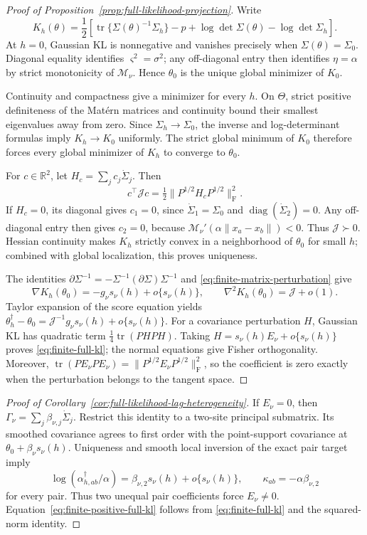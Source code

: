 \documentclass[11pt]{article}
\theoremstyle{remark}
\newcommand{\Matern}{\mathcal M}
\newcommand{\R}{\mathbb R}
\newcommand{\tr}{\operatorname{tr}}
\begin{document}
\begin{proof}[Proof of Proposition~\ref{prop:full-likelihood-projection}]
Write
\[
 K_h(\theta)=\frac12\left[
 \tr\{\Sigma(\theta)^{-1}\Sigma_h\}-p+
 \log\det\Sigma(\theta)-\log\det\Sigma_h\right].
\]
At \(h=0\), Gaussian KL is nonnegative and vanishes precisely when
\(\Sigma(\theta)=\Sigma_0\). Diagonal equality identifies
\(\varsigma^2=\sigma^2\); any off-diagonal entry then identifies
\(\eta=\alpha\) by strict monotonicity of \(\Matern_\nu\). Hence
\(\theta_0\) is the unique global minimizer of \(K_0\).

Continuity and compactness give a minimizer for every \(h\). On \(\Theta\),
strict positive definiteness of the Matérn matrices and continuity bound their
smallest eigenvalues away from zero. Since
\(\Sigma_h\to\Sigma_0\), the inverse and log-determinant formulas imply
\(K_h\to K_0\) uniformly. The strict global minimum of \(K_0\) therefore
forces every global minimizer of \(K_h\) to converge to \(\theta_0\).

For \(c\in\R^2\), let \(H_c=\sum_jc_j\dot\Sigma_j\). Then
\[
 c^\top\mathcal Jc
 =\tfrac12\|P^{1/2}H_cP^{1/2}\|_{\mathrm F}^2.
\]
If \(H_c=0\), its diagonal gives \(c_1=0\), since
\(\dot\Sigma_1=\Sigma_0\) and
\(\operatorname{diag}(\dot\Sigma_2)=0\). Any off-diagonal entry then gives
\(c_2=0\), because \(\Matern_\nu'(\alpha\|x_a-x_b\|)<0\). Thus
\(\mathcal J\succ0\). Hessian continuity makes \(K_h\) strictly convex in a
neighborhood of \(\theta_0\) for small \(h\); combined with global
localization, this proves uniqueness.

The identities \(\partial\Sigma^{-1}=-\Sigma^{-1}(\partial\Sigma)
\Sigma^{-1}\) and \eqref{eq:finite-matrix-perturbation} give
\[
 \nabla K_h(\theta_0)=-g_\nu s_\nu(h)+o\{s_\nu(h)\},\qquad
 \nabla^2K_h(\theta_0)=\mathcal J+o(1).
\]
Taylor expansion of the score equation yields
\(\theta_h^\dagger-\theta_0=\mathcal J^{-1}g_\nu s_\nu(h)
+o\{s_\nu(h)\}\). For a covariance perturbation \(H\), Gaussian KL has
quadratic term \(\tfrac14\tr(PHPH)\). Taking
\(H=s_\nu(h)E_\nu+o\{s_\nu(h)\}\) proves
\eqref{eq:finite-full-kl}; the normal equations give Fisher orthogonality.
Moreover,
\(\tr(PE_\nu PE_\nu)=\|P^{1/2}E_\nu P^{1/2}\|_{\mathrm F}^2\), so the
coefficient is zero exactly when the perturbation belongs to the tangent space.
\end{proof}

\begin{proof}[Proof of Corollary~\ref{cor:full-likelihood-lag-heterogeneity}]
If \(E_\nu=0\), then
\(\Gamma_\nu=\sum_j\beta_{\nu,j}\dot\Sigma_j\). Restrict this identity to a
two-site principal submatrix. Its smoothed covariance agrees to first order
with the point-support covariance at
\(\theta_0+\beta_\nu s_\nu(h)\). Uniqueness and smooth local inversion of the
exact pair target imply
\[
 \log(\alpha_{h,ab}^\dagger/\alpha)
 =\beta_{\nu,2}s_\nu(h)+o\{s_\nu(h)\},
 \qquad \kappa_{ab}=-\alpha\beta_{\nu,2}
\]
for every pair. Thus two unequal pair coefficients force \(E_\nu\ne0\).
Equation~\eqref{eq:finite-positive-full-kl} follows from
\eqref{eq:finite-full-kl} and the squared-norm identity.
\end{proof}
\end{document}
